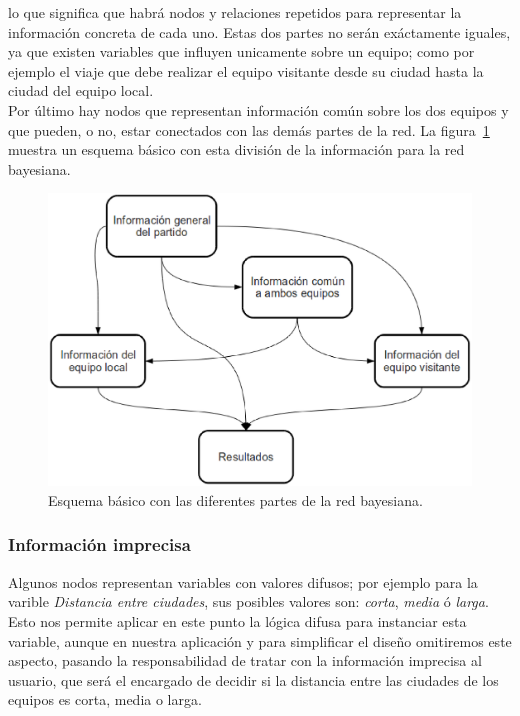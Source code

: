 \documentclass[a4paper,12pt]{article}
\begin{document}
lo que significa que habrá nodos y relaciones repetidos para representar la información concreta de cada uno.
Estas dos partes no serán exáctamente iguales, ya que existen variables que influyen unicamente sobre un equipo;
como por ejemplo el viaje que debe realizar el equipo visitante desde su ciudad hasta la ciudad del equipo local.
\\Por último hay nodos que representan información común sobre los dos equipos y que pueden, o no, estar conectados con las demás partes de la red.
La figura~\ref{fig:esquemaRed} muestra un esquema básico con esta división de la información para la red bayesiana.
\begin{figure}[h]
 \begin{center}
  \includegraphics[scale=0.4]{esquemaRed.eps}
\caption{Esquema básico con las diferentes partes de la red bayesiana.}
\label{fig:esquemaRed}
 \end{center}
\end{figure} 

 \subsubsection{Información imprecisa}
\par
Algunos nodos representan variables con valores difusos; por ejemplo para la varible \textit{Distancia entre ciudades},
sus posibles valores son: \textit{corta}, \textit{media} ó \textit{larga}.
Esto nos permite aplicar en este punto la lógica difusa para instanciar esta variable,
aunque en nuestra aplicación y para simplificar el diseño omitiremos este aspecto,
pasando la responsabilidad de tratar con la información imprecisa al usuario, que será el encargado de decidir si la distancia entre las ciudades de los equipos es corta, media o larga.
\end{document}
